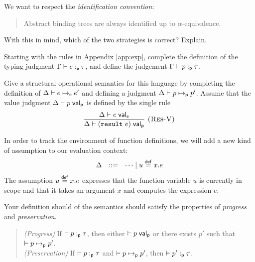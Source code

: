 \documentclass{article}
\begin{document}
\begin{task} \label{task:scope}
  We want to respect the \emph{identification convention}:
  \begin{quote}
    Abstract binding trees are always identified up to $\alpha$-equivalence.
  \end{quote}
  With this in mind, which of the two strategies is correct? Explain.
\end{task}
\begin{sol}
\end{sol}

\begin{task} \label{task:typing} Starting with the rules in Appendix
  \ref{app:exp}, complete the definition of the typing judgment $\Gamma
  \vdash e :_{\mathsf{e}} \tau$, and define the judgement
  $\Gamma \vdash p :_{\mathsf{p}} \tau$.
\end{task}
\begin{sol}
\end{sol}

\begin{task} \label{task:sos}
  Give a structural operational semantics for this language by
  completing the definition of $\Delta \vdash e \mapsto_{\mathsf{e}} e'$ and
  defining a judgment $\Delta \vdash p \mapsto_{\mathsf{p}} p'$. Assume that the
  value judgment $\Delta \vdash p\; \mathsf{val}_{\mathsf{p}}$ is defined by the single rule
  \[
  \infer[\rulename{Res-V}]
    {\D \entails \pval{(\pres{e})}}
    {\D \entails \eval{e}}
  \]

  In order to track the environment of function definitions, we will
  add a new kind of assumption to our evaluation context:
  \[
  \begin{array}{lcl}
    \Delta & ::= & \cdots \mid u \overset{\mathsf{def}}{=} x.e
  \end{array}
  \]
  The assumption $u \overset{\mathsf{def}}{=} x.e$ expresses that the function
  variable $u$ is currently in scope and that it takes an argument $x$
  and computes the expression $e$.

  Your definition should of the semantics should satisfy the
  properties of \emph{progress} and \emph{preservation}.

  \begin{quote}
    \emph{(Progress)} If $\vdash p :_{\mathsf{p}} \tau$, then either
    $\vdash p\; \mathsf{val}_{\mathsf{p}}$ or there exists $p'$ such that
    $\vdash p \mapsto_{\mathsf{p}} p'$. \\
    \emph{(Preservation)} If $\vdash p :_{\mathsf{p}} \tau$ and $\vdash
    p \mapsto_{\mathsf{p}} p'$, then $\vdash p' :_{\mathsf{p}} \tau$.
  \end{quote}
\end{task}
\begin{sol}
\end{sol}
\end{document}
